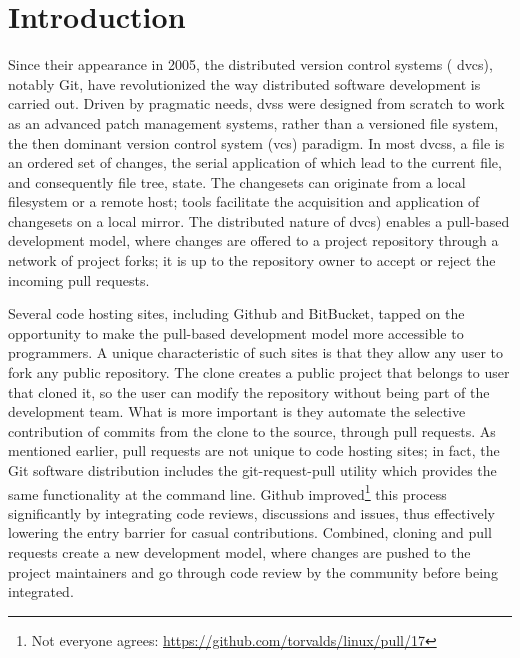 \documentclass{sig-alternate}
\begin{document}


\section{Introduction}

Since their appearance in 2005, the distributed version control systems ({\sc
dvcs}), notably Git, have revolutionized the way distributed software
development is carried out. Driven by pragmatic needs, {\sc dvs}s were designed
from scratch to work as an advanced patch management systems, rather than a
versioned file system, the then dominant version control system ({\sc vcs})
paradigm. In most {\sc dvcs}s, a file is an ordered set of changes, the serial
application of which lead to the current file, and consequently file tree,
state. The changesets can originate from a local filesystem or a remote host;
tools facilitate the acquisition and application of changesets on a local
mirror. The distributed nature of {\sc dvcs}) enables a pull-based development
model, where changes are offered to a project repository through a network of
project forks; it is up to the repository owner to accept or reject the incoming
pull requests.

Several code hosting sites, including Github and BitBucket, tapped on the
opportunity to make the pull-based development model more accessible to
programmers. A unique characteristic of such sites is that they allow any user
to fork any public repository. The clone creates a public project that belongs
to user that cloned it, so the user can modify the repository without being part
of the development team. What is more important is they automate the selective
contribution of commits from the clone to the source, through pull requests. As
mentioned earlier, pull requests are not unique to code hosting sites; in fact,
the Git software distribution includes the \textsf{git-request-pull} utility
which provides the same functionality at the command line. Github
improved\footnote{Not everyone agrees:
\url{https://github.com/torvalds/linux/pull/17}} this process significantly by
integrating code reviews, discussions and issues, thus effectively lowering the
entry barrier for casual contributions. Combined, cloning and pull requests
create a new development model, where changes are pushed to the project
maintainers and go through code review by the community before being integrated. 
\end{document}
